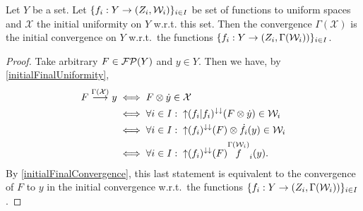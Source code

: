 \begin{proposition}
Let $Y$ be a set. Let $\{f_i: Y\to \left( Z_i, \mathcal{W}_i \right)\}_{i\in I}$ be set of functions to uniform spaces and $\mathcal{X}$ the initial uniformity on $Y$ w.r.t. this set. Then the convergence $\Gamma(\mathcal{X})$ is the initial convergence on $Y$ w.r.t.\ the functions $\{f_i: Y\to \left( Z_i, \Gamma(\mathcal{W}_i) \right)\}_{i\in I}$.
\end{proposition}
\begin{proof}
Take arbitrary $F\in\operatorname{\mathcal{FP}}(Y)$ and $y\in Y$. Then we have, by \ref{initialFinalUniformity},
\begin{align*}
F \overset{\Gamma(\mathcal{X})}{\longrightarrow} y &\iff F\otimes \dot{y} \in \mathcal{X} \\
&\iff \forall i\in I:\; \operatorname{\uparrow} (f_i|f_i)^{\downarrow\downarrow}(F\otimes \dot{y}) \in \mathcal{W}_i \\
&\iff \forall i\in I:\; \operatorname{\uparrow} (f_i)^{\downarrow\downarrow}(F)\otimes \dot{f}_i(y) \in \mathcal{W}_i \\
&\iff \forall i\in I:\; \operatorname{\uparrow} (f_i)^{\downarrow\downarrow}(F)\overset{\Gamma(\mathcal{W}_i)} f_i(y).
\end{align*}
By \ref{initialFinalConvergence}, this last statement is equivalent to the convergence of $F$ to $y$ in the initial convergence w.r.t.\ the functions $\{f_i: Y\to \left( Z_i, \Gamma(\mathcal{W}_i) \right)\}_{i\in I}$.
\end{proof}


